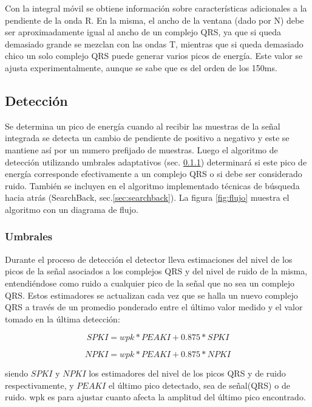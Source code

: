 \documentclass[%
        final,
        notitlepage,
        narroweqnarray,
        inline,
        ]{ieee}
\numberwithin{equation}{section}
\numberwithin{figure}{section}
\numberwithin{table}{section}
\begin{document}
Con la integral móvil se obtiene información sobre características
adicionales a la pendiente de la onda R. En la misma, el ancho de la ventana (dado por N)
debe ser aproximadamente igual al ancho de un complejo QRS, ya que si queda demasiado
grande se mezclan con las ondas T, mientras que si queda demasiado chico un solo complejo
QRS puede generar varios picos de energía. Este valor se ajusta experimentalmente, aunque
se sabe que es del orden de los 150ms.

\subsection{Detección}

Se determina un pico de energía cuando al recibir las muestras de la señal integrada se detecta 
un cambio de pendiente de positivo a negativo y este se mantiene así por un numero prefijado de 
muestras. Luego el algoritmo de detección utilizando umbrales adaptativos (sec. \ref{sec:umbral}) determinará 
si este pico de energía corresponde efectivamente a un complejo QRS o si debe ser considerado ruido. 
También se incluyen en el algoritmo implementado técnicas de búsqueda hacia atrás (SearchBack, sec.\ref{sec:searchback}).
La figura \ref{fig:flujo} muestra el algoritmo con un diagrama de flujo.

\subsubsection{Umbrales}\label{sec:umbral}

Durante el proceso de detección el detector lleva estimaciones del nivel de los picos de la señal asociados a los complejos QRS y del nivel de ruido de la misma, entendiéndose como ruido a cualquier pico de la señal que no sea un complejo QRS.
Estos estimadores se actualizan cada vez que se halla un nuevo complejo QRS a través de un promedio ponderado entre el último valor medido y el valor tomado en la última detección:

\begin{equation}
SPKI = wpk*PEAKI + 0.875*SPKI
\end{equation}

\begin{equation}
NPKI = wpk*PEAKI + 0.875*NPKI
\end{equation}

siendo $SPKI$ y $NPKI$ los estimadores del nivel de los picos QRS y de ruido respectivamente, y $PEAKI$ el último pico detectado, sea de señal(QRS) o de ruido. wpk es para ajustar cuanto afecta la amplitud del último pico encontrado.
\end{document}
